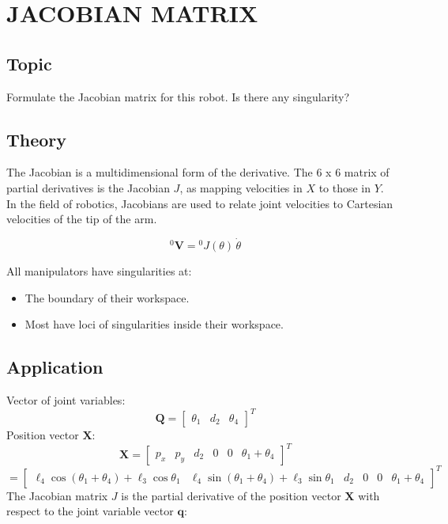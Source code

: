 \chapter{JACOBIAN MATRIX}
\section{Topic}
Formulate the Jacobian matrix for this robot. Is there any singularity?
\section{Theory}
The Jacobian is a multidimensional form of the derivative. The 6 x 6 matrix of partial derivatives is the Jacobian $J$, as mapping velocities in $X$ to those in $Y$. \\
In the field of robotics, Jacobians are used to relate joint velocities to Cartesian velocities of the tip of the arm.

\[
{}^0\mathbf{V} = {}^0\!J(\theta) \, \dot{\theta}
\]

All manipulators have singularities at:
\begin{itemize}
    \item The boundary of their workspace.
    \item Most have loci of singularities inside their workspace.
\end{itemize}
\section{Application}
Vector of joint variables:
\[
\mathbf{Q} = \begin{bmatrix} \theta_1 & d_2 & \theta_4 \end{bmatrix}^T
\]
Position vector $\mathbf{X}$:
\[
\mathbf{X} = \begin{bmatrix} p_x & p_y & d_2 & 0 & 0 & \theta_1 + \theta_4 \end{bmatrix}^T
\]
\[
= \begin{bmatrix} 
\ell_4 \cos(\theta_1 + \theta_4) + \ell_3 \cos \theta_1 & 
\ell_4 \sin(\theta_1 + \theta_4) + \ell_3 \sin \theta_1 & 
d_2 & 
0 & 
0 & 
\theta_1 + \theta_4 
\end{bmatrix}^T
\]
The Jacobian matrix $J$ is the partial derivative of the position vector $\mathbf{X}$ with respect to the joint variable vector $\mathbf{q}$:

